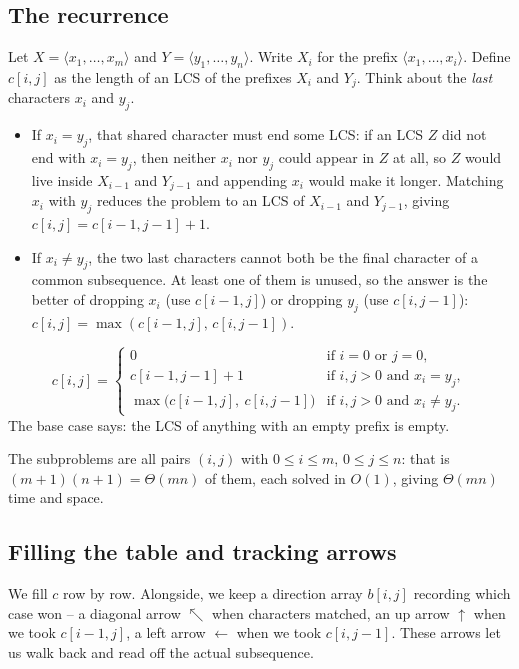 \subsection{The recurrence}

Let $X = \langle x_1, \dots, x_m\rangle$ and $Y = \langle y_1, \dots, y_n\rangle$.
Write $X_i$ for the prefix $\langle x_1,\dots,x_i\rangle$. Define $c[i,j]$ as the
length of an LCS of the prefixes $X_i$ and $Y_j$. Think about the
\emph{last} characters $x_i$ and $y_j$.

\begin{itemize}
  \item If $x_i = y_j$, that shared character must end some LCS: if an LCS $Z$
  did not end with $x_i = y_j$, then neither $x_i$ nor $y_j$ could appear in $Z$
  at all, so $Z$ would live inside $X_{i-1}$ and $Y_{j-1}$ and appending $x_i$
  would make it longer. Matching $x_i$ with $y_j$ reduces the problem to an LCS
  of $X_{i-1}$ and $Y_{j-1}$, giving $c[i,j] = c[i-1,j-1] + 1$.
  \item If $x_i \ne y_j$, the two last characters cannot both be the final
  character of a common subsequence. At least one of them is unused, so the
  answer is the better of dropping $x_i$ (use $c[i-1,j]$) or dropping $y_j$
  (use $c[i,j-1]$): $c[i,j] = \max(c[i-1,j],\, c[i,j-1])$.
\end{itemize}

\begin{focusbox}
\[
  c[i,j] =
  \begin{cases}
    0 & \text{if } i = 0 \text{ or } j = 0,\\[3pt]
    c[i-1,j-1] + 1 & \text{if } i,j > 0 \text{ and } x_i = y_j,\\[3pt]
    \max\bigl(c[i-1,j],\ c[i,j-1]\bigr) & \text{if } i,j > 0 \text{ and } x_i \ne y_j.
  \end{cases}
\]
The base case says: the LCS of anything with an empty prefix is empty.
\end{focusbox}

The subproblems are all pairs $(i,j)$ with $0\le i\le m$, $0\le j\le n$: that is
$(m+1)(n+1) = \Theta(mn)$ of them, each solved in $O(1)$, giving $\Theta(mn)$
time and space.

\subsection{Filling the table and tracking arrows}

We fill $c$ row by row. Alongside, we keep a direction array $b[i,j]$ recording
which case won -- a diagonal arrow $\nwarrow$ when characters matched, an up
arrow $\uparrow$ when we took $c[i-1,j]$, a left arrow $\leftarrow$ when we took
$c[i,j-1]$. These arrows let us walk back and read off the actual subsequence.


